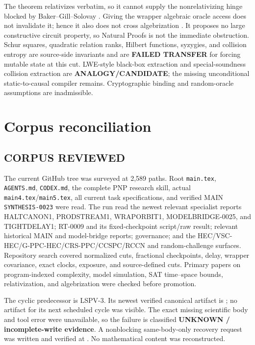 \documentclass[11pt]{article}
\begin{document}
The theorem relativizes verbatim, so it cannot supply the nonrelativizing
hinge blocked by Baker--Gill--Solovay \cite{bgs}.  Giving the wrapper algebraic
oracle access does not invalidate it; hence it also does not cross
algebrization \cite{aw}.  It proposes no large constructive circuit property,
so Natural Proofs is not the immediate obstruction.  Schur squares, quadratic
relation ranks, Hilbert functions, syzygies, and collision entropy are
source-side invariants and are \textbf{FAILED TRANSFER} for forcing mutable
state at this cut.  LWE-style black-box extraction and special-soundness
collision extraction are \textbf{ANALOGY/CANDIDATE}; the missing unconditional
static-to-causal compiler remains.  Cryptographic binding and random-oracle
assumptions are inadmissible.

\section{Corpus reconciliation}

\subsection*{CORPUS REVIEWED}
The current GitHub tree was surveyed at 2,589 paths.  Root \texttt{main.tex},
\texttt{AGENTS.md}, \texttt{CODEX.md}, the complete PNP research skill, actual
\texttt{main4.tex}/\texttt{main5.tex}, all current task specifications, and
verified MAIN \texttt{SYNTHESIS-0023} were read.  The run read the newest
relevant specialist reports HALTCANON1, PRODSTREAM1, WRAPORBIT1,
MODELBRIDGE-0025, and TIGHTDELAY1; RT-0009 and its fixed-checkpoint script/raw
result; relevant historical MAIN and model-bridge reports; governance; and the
HEC/VSC-HEC/G-PPC-HEC/CRS-PPC/CCSPC/RCCN and random-challenge surfaces.
Repository search covered normalized cuts, fractional checkpoints, delay,
wrapper covariance, exact clocks, exposure, and source-defined cuts.  Primary
papers on program-indexed complexity, model simulation, SAT time--space bounds,
relativization, and algebrization were checked before promotion.

The cyclic predecessor is LSPV-3.  Its newest verified canonical artifact is
; no artifact
for its next scheduled cycle was visible.  The exact missing scientific body
and tool error were unavailable, so the failure is classified
\textbf{UNKNOWN / incomplete-write evidence}.  A nonblocking same-body-only
recovery request was written and verified at
.
No mathematical content was reconstructed.
\end{document}
